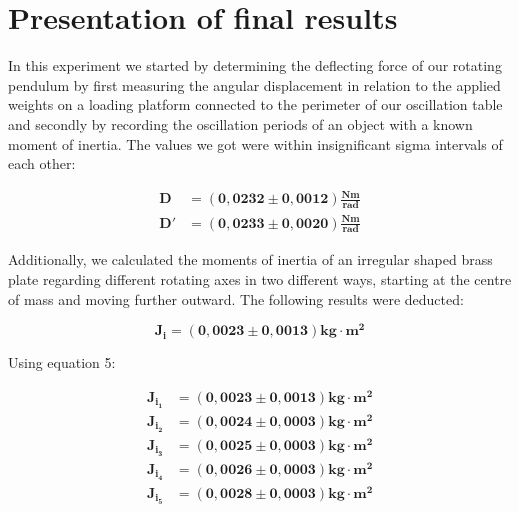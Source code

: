 \documentclass{article}
\begin{document}
\newpage
\section{Presentation of final results}

In this experiment we started by determining the deflecting force of our rotating pendulum by first measuring the angular displacement in relation to the applied weights on a loading platform connected to the perimeter of our oscillation table and secondly by recording the oscillation periods of an object with a known moment of inertia. The values we got were within insignificant sigma intervals of each other:

\begin{equation}
    \begin{split}
        \bm{D} &= \bm{(0,0232 \pm 0,0012)} \frac{\textbf{Nm}}{\textbf{rad}} \\
        \bm{D'} &= \bm{(0,0233 \pm 0,0020)} \frac{\textbf{Nm}}{\textbf{rad}}
    \end{split}
\end{equation}

Additionally, we calculated the moments of inertia of an irregular shaped brass plate regarding different rotating axes in two different ways, starting at the centre of mass and moving further outward. The following results were deducted:

\begin{equation}
        \bm{J_i} = \bm{(0,0023 \pm 0,0013) \textbf{kg} \cdot \textbf{m}^2}
\end{equation}

Using equation 5:

\begin{equation}
    \begin{split}
        \bm{J_{i_1}} &= \bm{(0,0023 \pm 0,0013) \textbf{kg} \cdot \textbf{m}^2} \\
        \bm{J_{i_2}} &= \bm{(0,0024 \pm 0,0003) \textbf{kg} \cdot \textbf{m}^2} \\
        \bm{J_{i_3}} &= \bm{(0,0025 \pm 0,0003) \textbf{kg} \cdot \textbf{m}^2} \\
        \bm{J_{i_4}} &= \bm{(0,0026 \pm 0,0003) \textbf{kg} \cdot \textbf{m}^2} \\
        \bm{J_{i_5}} &= \bm{(0,0028 \pm 0,0003) \textbf{kg} \cdot \textbf{m}^2} \\
    \end{split}
\end{equation}
\end{document}
